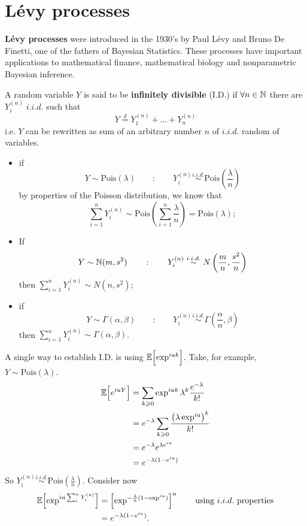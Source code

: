 \documentclass[class=article,crop=false]{standalone}
\begin{document}
\section{L\'evy processes}
\textbf{L\'evy processes} were introduced in the 1930's by Paul L\'evy and Bruno De Finetti, one of the fathers of Bayesian Statistics. These processes have important applications to mathematical finance, mathematical biology and nonparametric Bayesian inference.
\begin{definition}
		A random variable $Y$ is said to be \textbf{infinitely divisible} (I.D.) if $\forall n \in \mathbb{N}$ there are $Y_i^{(n)}\; i.i.d.$ such that
	\[
	Y\stackrel{d}{=}Y_1^{(n)}+\ldots+Y_n^{(n)}
	\]
	i.e. $Y$ can be rewritten as sum of an arbitrary number $n$ of $i.i.d.$ random of variables.
\end{definition}
\begin{example}
	\begin{itemize}
		\item if \[
		Y\sim\text{Pois}(\lambda)\qquad:\qquad Y_i^{(n)}\stackrel{i.i.d.}{\sim}\text{Pois}\left(\frac{\lambda}{n}\right)
		\]
		by properties of the Poisson distribution, we know that
		\[\sum_{i=1}^{n}Y_i^{(n)}\sim \text{Pois}\left(\sum_{i=1}^{n}\frac{\lambda}{n}\right)=\text{Pois}(\lambda);\]
		\item If \[
		Y\sim\mathbb{N}(m,s^2)\qquad:\qquad Y_i^{(n)}\stackrel{i.i.d.}{\sim}N\left(\frac{m}{n},\frac{s^2}{n}\right)
		\]
		then $\sum_{i=1}^{n}Y_i^{(n)}\sim N(n,s^2)$;
		\item if \[
		Y\sim\Gamma(\alpha,\beta)\qquad:\qquad Y_i^{(n)}\stackrel{i.i.d.}{\sim}\Gamma\left(\frac{\alpha}{n},\beta\right)
		\]
		then $\sum_{i=1}^{n}Y_i^{(n)}\sim \Gamma(\alpha,\beta)$.
	\end{itemize}
\end{example}
A single way to establish I.D. is using $\mathbb{E}\Bigl[{\exp^{iuk}}\Bigr]$. Take, for example, $Y\sim\text{Pois}(\lambda)$.
\begin{align*}
	\mathbb{E}\Bigl[{e^{iuY}}\Bigr]&=\sum_{k\geqslant0}\exp^{iuk}\lambda^k\frac{e^{-\lambda}}{k!}\\
	&=e^{-\lambda}\sum_{k\geqslant0}\frac{\left(\lambda\exp^{iu}\right)^k}{k!}\\
	&=e^{-\lambda}e^{\lambda e^{iu}}\\
	&=e^{-\lambda(1-e^{iu})}
\end{align*}
So $Y_i^{(n)}\stackrel{i.i.d.}{\sim}\text{Pois}(\frac{\lambda}{n})$. Consider now
\begin{align*}
	\mathbb{E}\Bigl[{\exp^{iu\sum_{i}^{n}Y_i^{(n)}}}\Bigr]&=\left[\exp^{-\frac{\lambda}{n}(1-\exp^{iu})}\right]^n\qquad \text{using }i.i.d.\text{ properties}\\
	&=e^{-\lambda(1-e^{iu})}.
\end{align*}
\end{document}
